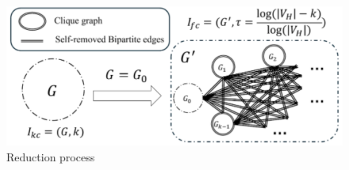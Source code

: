 \documentclass[sigconf]{acmart}
\begin{document}
\begin{figure}[t]
\centering
\includegraphics[width=0.9\linewidth]{figures/np-proof.pdf}
\vspace{-0.3cm} 
\caption{Reduction process} 
\vspace{-0.5cm} 
\label{fig:relax}
\end{figure}
\end{document}
